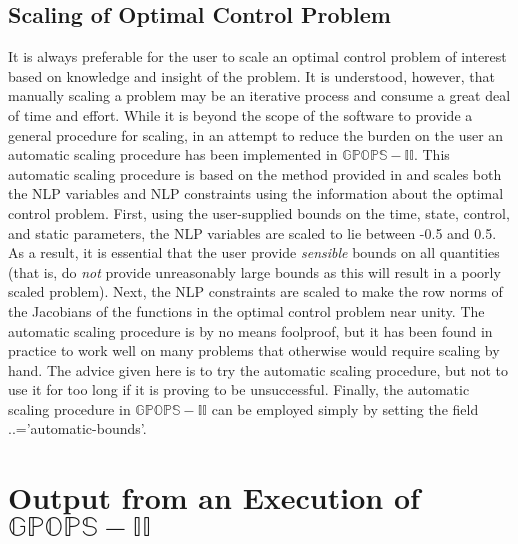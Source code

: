 \documentclass[10pt]{article}
\newcommand{\bfblue}[1]{\textrm{{\color{blue}{\bf #1}}}}
\newcommand{\slred}[1]{\textrm{\color{red}{\sl #1}}}
\begin{document}
\subsection{Scaling of Optimal Control Problem\label{sect:scaling}}

It is always preferable for the user to scale an optimal control
problem of interest based on knowledge and insight of the problem.  It
is understood, however, that manually scaling a problem may be an
iterative process and consume a great deal of time and effort.   While
it is beyond the scope of the software to provide a general procedure
for scaling, in an attempt to reduce the burden on the user an
automatic scaling procedure has been implemented in $\mathbb{GPOPS-II}$.
This automatic scaling procedure is based on the method provided in
\cite{Betts3} and scales both the NLP variables and NLP constraints
using the information about the optimal control problem.  First, using
the user-supplied bounds on the time, state, control, and static
parameters, the NLP variables are scaled to lie between -0.5 and 0.5.
As a result, it is essential that the user provide {\em sensible}
bounds on all quantities (that is, do {\em not} provide unreasonably
large bounds as this will result in a poorly scaled problem).  Next,
the NLP constraints are scaled to make the row norms of the Jacobians
of the functions in the optimal control problem near unity.  The
automatic scaling procedure is by no means foolproof, but it has been
found in practice to work well on many problems that otherwise would
require scaling by hand.  The advice given here is to try the
automatic scaling procedure, but not to use it for too long if it is
proving to be unsuccessful.  Finally, the automatic scaling procedure
in $\mathbb{GPOPS-II}$ can be employed simply by setting the field
\slred{setup}.\bfblue{scales}.\bfblue{method}='automatic-bounds'.  

\section{Output from an Execution of $\mathbb{GPOPS-II}$\label{sect:output}}
\end{document}
